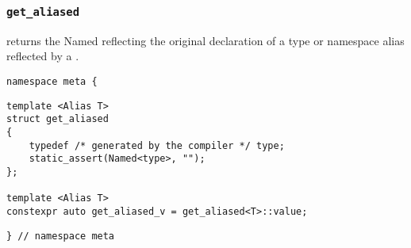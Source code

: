
\subsubsection{\texttt{get\_aliased}}

returns the Named reflecting the original declaration of a type or namespace alias reflected by a .

\begin{verbatim}
namespace meta {
\end{verbatim}
\begin{verbatim}
template <Alias T>
struct get_aliased
{
	typedef /* generated by the compiler */ type;
	static_assert(Named<type>, "");
};
	
template <Alias T>
constexpr auto get_aliased_v = get_aliased<T>::value;
\end{verbatim}
\begin{verbatim}
} // namespace meta
\end{verbatim}
